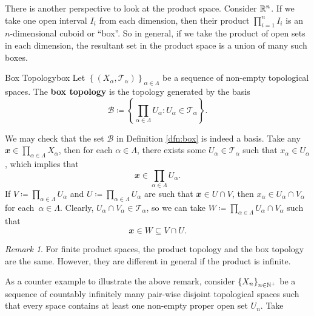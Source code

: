 \documentclass[math]{amznotes}
\theoremstyle{remark}
\newtheorem*{remark}{Remark}
\begin{document}
There is another perspective to look at the product space. Consider $\mathbb{R}^n$. If we take one open interval $I_i$ from each dimension, then their product $\prod_{i = 1}^{n}I_i$ is an $n$-dimensional cuboid or ``box''. So in general, if we take the product of open sets in each dimension, the resultant set in the product space is a union of many such boxes. 
\begin{dfnbox}{Box Topology}{box}
    Let $\left\{\left(X_{\alpha}, \mathcal{T}_{\alpha}\right)\right\}_{\alpha \in \Lambda}$ be a sequence of non-empty topological spaces. The {\color{red} \textbf{box topology}} is the topology generated by the basis 
    \begin{equation*}
        \mathcal{B} \coloneqq \left\{\prod_{\alpha \in \Lambda}U_{\alpha} \colon U_{\alpha} \in \mathcal{T}_{\alpha}\right\}.
    \end{equation*}
\end{dfnbox}
We may check that the set $\mathcal{B}$ in Definition \ref{dfn:box} is indeed a basis. Take any $\mathbfit{x} \in \prod_{\alpha \in \Lambda}X_{\alpha}$, then for each $\alpha \in \Lambda$, there exists some $U_{\alpha} \in \mathcal{T}_{\alpha}$ such that $x_{\alpha} \in U_{\alpha}$, which implies that 
\begin{equation*}
    \mathbfit{x} \in \prod_{\alpha \in \Lambda}U_{\alpha}.
\end{equation*}
If $V \coloneqq \prod_{\alpha \in \Lambda}U_{\alpha}$ and $U \coloneqq \prod_{\alpha \in \Lambda}U_{\alpha}$ are such that $\mathbfit{x} \in U \cap V$, then $x_{\alpha} \in U_{\alpha} \cap V_{\alpha}$ for each~$\alpha \in \Lambda$. Clearly, $U_{\alpha} \cap V_{\alpha} \in \mathcal{T}_{\alpha}$, so we can take $W \coloneqq \prod_{\alpha \in \Lambda}U_{\alpha} \cap V_{\alpha}$ such that 
\begin{equation*}
    \mathbfit{x} \in W \subseteq V \cap U.
\end{equation*}
\begin{notebox}
    \begin{remark}
        For finite product spaces, the product topology and the box topology are the same. However, they are different in general if the product is infinite.
    \end{remark}
\end{notebox}
As a counter example to illustrate the above remark, consider $\left\{X_n\right\}_{n \in \mathbb{N}^+}$ be a sequence of countably infinitely many pair-wise disjoint topological spaces such that every space contains at least one non-empty proper open set $U_n$. Take 
\end{document}

